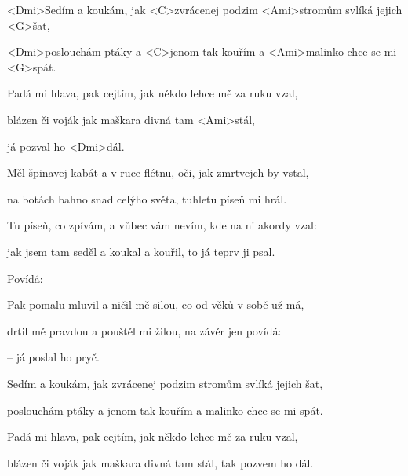 

\zs
<Dmi>Sedím a koukám, jak <C>zvrácenej podzim <Ami>stromům svlíká jejich <G>šat,

<Dmi>poslouchám ptáky a <C>jenom tak kouřím a <Ami>malinko chce se mi <G>spát.

Padá mi hlava, pak cejtím, jak někdo lehce mě za ruku vzal,

blázen či voják jak maškara divná tam <Ami>stál,

já pozval ho <Dmi>dál.
\ks

\zs
Měl špinavej kabát a v ruce flétnu, oči, jak zmrtvejch by vstal,

na botách bahno snad celýho světa, tuhletu píseň mi hrál.

Tu píseň, co zpívám, a vůbec vám nevím, kde na ni akordy vzal:

jak jsem tam seděl a koukal a kouřil, to já teprv ji psal.
\ks

\zs
Povídá: 
\ks

\zs
Pak pomalu mluvil a ničil mě silou, co od věků v sobě už má,

drtil mě pravdou a pouštěl mi žilou, na závěr jen povídá:

 -- já poslal ho pryč.
\ks

\zs
Sedím a koukám, jak zvrácenej podzim stromům svlíká jejich šat,

poslouchám ptáky a jenom tak kouřím a malinko chce se mi spát.

Padá mi hlava, pak cejtím, jak někdo lehce mě za ruku vzal,

blázen či voják jak maškara divná tam stál, tak pozvem ho dál.
\ks

\kp
